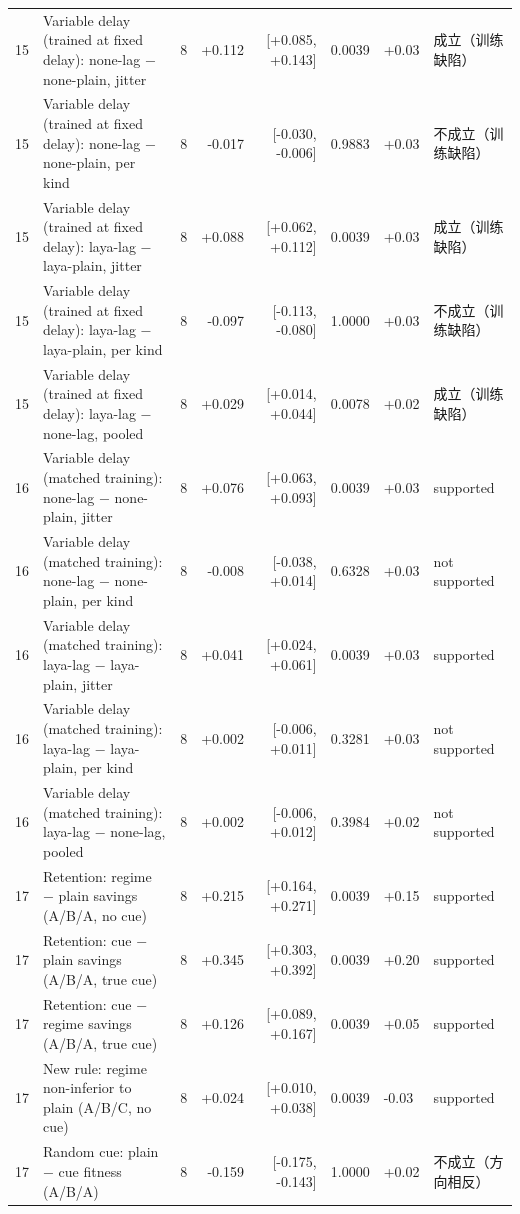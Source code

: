 \begin{table}[t]
{\begin{tabular}{@{}llrrrrll@{}}
15 & Variable delay (trained at fixed delay): none-lag $-$ none-plain, jitter & 8 & +0.112 & [+0.085, +0.143] & 0.0039 & +0.03 & 成立（训练缺陷） \\
15 & Variable delay (trained at fixed delay): none-lag $-$ none-plain, per kind & 8 & -0.017 & [-0.030, -0.006] & 0.9883 & +0.03 & 不成立（训练缺陷） \\
15 & Variable delay (trained at fixed delay): laya-lag $-$ laya-plain, jitter & 8 & +0.088 & [+0.062, +0.112] & 0.0039 & +0.03 & 成立（训练缺陷） \\
15 & Variable delay (trained at fixed delay): laya-lag $-$ laya-plain, per kind & 8 & -0.097 & [-0.113, -0.080] & 1.0000 & +0.03 & 不成立（训练缺陷） \\
15 & Variable delay (trained at fixed delay): laya-lag $-$ none-lag, pooled & 8 & +0.029 & [+0.014, +0.044] & 0.0078 & +0.02 & 成立（训练缺陷） \\
16 & Variable delay (matched training): none-lag $-$ none-plain, jitter & 8 & +0.076 & [+0.063, +0.093] & 0.0039 & +0.03 & supported \\
16 & Variable delay (matched training): none-lag $-$ none-plain, per kind & 8 & -0.008 & [-0.038, +0.014] & 0.6328 & +0.03 & not supported \\
16 & Variable delay (matched training): laya-lag $-$ laya-plain, jitter & 8 & +0.041 & [+0.024, +0.061] & 0.0039 & +0.03 & supported \\
16 & Variable delay (matched training): laya-lag $-$ laya-plain, per kind & 8 & +0.002 & [-0.006, +0.011] & 0.3281 & +0.03 & not supported \\
16 & Variable delay (matched training): laya-lag $-$ none-lag, pooled & 8 & +0.002 & [-0.006, +0.012] & 0.3984 & +0.02 & not supported \\
17 & Retention: regime $-$ plain savings (A/B/A, no cue) & 8 & +0.215 & [+0.164, +0.271] & 0.0039 & +0.15 & supported \\
17 & Retention: cue $-$ plain savings (A/B/A, true cue) & 8 & +0.345 & [+0.303, +0.392] & 0.0039 & +0.20 & supported \\
17 & Retention: cue $-$ regime savings (A/B/A, true cue) & 8 & +0.126 & [+0.089, +0.167] & 0.0039 & +0.05 & supported \\
17 & New rule: regime non-inferior to plain (A/B/C, no cue) & 8 & +0.024 & [+0.010, +0.038] & 0.0039 & -0.03 & supported \\
17 & Random cue: plain $-$ cue fitness (A/B/A) & 8 & -0.159 & [-0.175, -0.143] & 1.0000 & +0.02 & 不成立（方向相反） \\

\end{tabular}}
\end{table}

